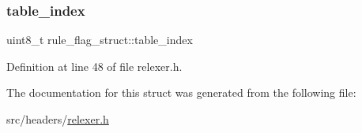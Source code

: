 \mbox{\label{structrule__flag__struct_aaae98036c87ad1ac6c46ceef4ad07a1f}} 
\subsubsection{\texorpdfstring{table\+\_\+index}{table\_index}}
{\footnotesize\ttfamily uint8\+\_\+t rule\+\_\+flag\+\_\+struct\+::table\+\_\+index}



Definition at line 48 of file relexer.\+h.



The documentation for this struct was generated from the following file\+:\begin{DoxyCompactItemize}
\item 
src/headers/\hyperlink{relexer_8h}{relexer.\+h}\end{DoxyCompactItemize}

